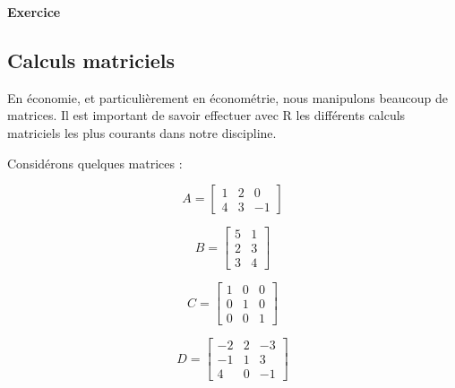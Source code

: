 \documentclass[
  11pt,
]{book}
\newcommand{\VERB}{\Verb[commandchars=\\\{\}]}
\newcommand{\ConstantTok}[1]{\textcolor[rgb]{0.00,0.00,0.00}{#1}}
\providecommand{\tightlist}{%
  \setlength{\itemsep}{0pt}\setlength{\parskip}{0pt}}
\numberwithin{equation}{section}
\numberwithin{countremarque}{section}
\newenvironment{greenbox}{
  \begin{tcolorbox}[breakable, colback=vert,coltext=black,
                  colframe=grisfonce]}
 {\end{tcolorbox}}
\begin{document}
\begin{greenbox}

\textbf{Exercice}


\end{greenbox}

\hypertarget{calculs-matriciels}{%
\subsection{Calculs matriciels}\label{calculs-matriciels}}

En économie, et particulièrement en économétrie, nous manipulons beaucoup de matrices. Il est important de savoir effectuer avec R les différents calculs matriciels les plus courants dans notre discipline.

Considérons quelques matrices :

\[A = \begin{bmatrix}1 & 2 & 0\\ 4 & 3 & -1\end{bmatrix}\]

\[B = \begin{bmatrix}5 & 1\\ 2 & 3\\ 3 & 4\end{bmatrix}\]

\[C = \begin{bmatrix}1 & 0 & 0 \\ 0 & 1 & 0 \\ 0 & 0 & 1\end{bmatrix}\]

\[D = \begin{bmatrix}-2 & 2 & -3 \\ -1 & 1 & 3\\4 & 0 & -1\end{bmatrix}\]
\end{document}
